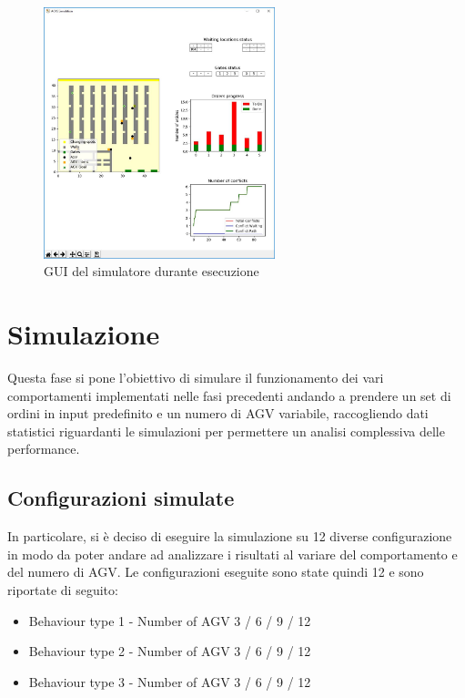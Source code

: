 \documentclass[12pt]{article}
\begin{document}
\begin{figure}[ht]
\centering
\includegraphics[width=0.6\textwidth,height=\textheight,keepaspectratio]{Figures/GUI/Simulatore_run2.jpg}
\caption[GUI del simulatore durante esecuzione]{GUI del simulatore  durante esecuzione}
\label{fig:SimulatoreEsec}
\end{figure}

\newpage
\section{Simulazione} %

Questa fase si pone l'obiettivo di simulare il funzionamento dei vari comportamenti implementati nelle fasi precedenti andando a prendere un set di ordini in input predefinito e un numero di AGV variabile, raccogliendo dati statistici riguardanti le simulazioni per permettere un analisi complessiva delle performance.

\subsection{Configurazioni simulate}
In particolare, si è deciso di eseguire la simulazione su 12 diverse configurazione in modo da poter andare ad analizzare i risultati al variare del comportamento e del numero di AGV.
Le configurazioni eseguite sono state quindi 12 e sono riportate di seguito:
\begin{itemize}
\setlength\itemsep{0.1em}
    \item \textbf{} Behaviour type 1 - Number of AGV 3 / 6 / 9 / 12
    \item \textbf{} Behaviour type 2 - Number of AGV 3 / 6 / 9 / 12
    \item \textbf{} Behaviour type 3 - Number of AGV 3 / 6 / 9 / 12
\end{itemize}
\end{document}
